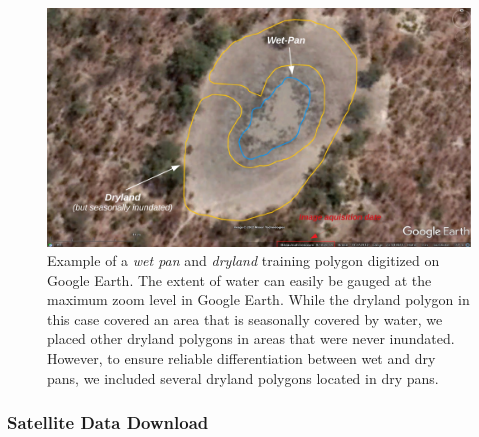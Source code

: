 \documentclass[../FinalThesis.tex]{subfiles}
\begin{document}
\begin{figure}[htpb]
 \begin{center}
  \includegraphics[width = \textwidth]{Figures/PanMapping.pdf}
  \caption{Example of a \textit{wet pan} and \textit{dryland} training polygon
  digitized on Google Earth. The extent of water can easily be gauged at the
  maximum zoom level in Google Earth. While the dryland polygon in this case
  covered an area that is seasonally covered by water, we placed other dryland
  polygons in areas that were never inundated. However, to ensure reliable
  differentiation between wet and dry pans, we included several dryland polygons
  located in dry pans.}
  \label{PanMapping}
 \end{center}
\end{figure}

\subsubsection{Satellite Data Download}
\label{Download}
\end{document}
